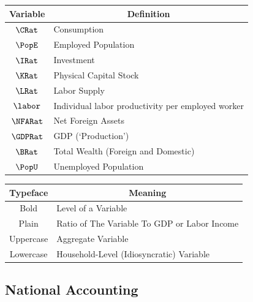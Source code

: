 \documentclass[titlepage]{\econtex}\newcommand{\texname}{cjSOE}
\begin{document}
\begin{center}
\begin{tabular}{|c|l|} \hline
 Variable & \multicolumn{1}{|c|}{Definition}  \\ \hline
 $\CRat$ & Consumption \\
 $\PopE$ & Employed Population \\
 $\IRat$ & Investment \\
 $\KRat$ & Physical Capital Stock \\
 $\LRat$ & Labor Supply \\
 $\labor$ & Individual labor productivity per employed worker \\
 $\NFARat$ & Net Foreign Assets \\
 $\GDPRat$ & GDP (`Production') \\
 $\BRat$ & Total Wealth (Foreign and Domestic) \\
 $\PopU$ & Unemployed Population \\
\hline
\end{tabular}
\end{center}

\begin{center}
\begin{tabular}{|c|l|} \hline
 Typeface & \multicolumn{1}{c|}{Meaning}  \\ \hline
 Bold & Level of a Variable \\
 Plain    & Ratio of The Variable To GDP or Labor Income  \\
 Uppercase & Aggregate Variable \\
 Lowercase    & Household-Level (Idiosyncratic) Variable  \\
\hline
\end{tabular}
\end{center}

\subsection{National Accounting}
\label{NatAc}
\end{document}
